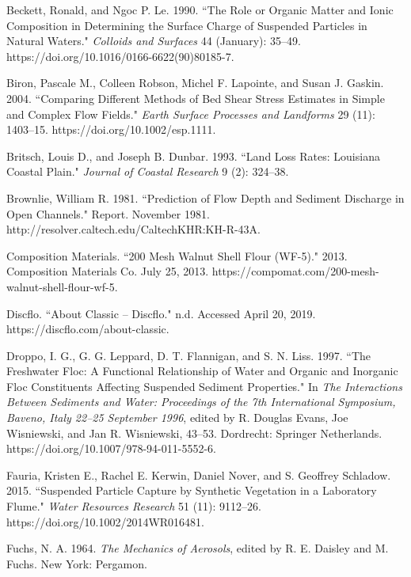 \documentclass[12pt]{article}
\begin{document}
\pagebreak

\begin{thebibliography}{20}
Beckett, Ronald, and Ngoc P. Le. 1990. ``The Role or Organic Matter and Ionic Composition in Determining the Surface Charge of Suspended Particles in Natural Waters." \textit{Colloids and Surfaces} 44 (January): 35–49. https://doi.org/10.1016/0166-6622(90)80185-7.

Biron, Pascale M., Colleen Robson, Michel F. Lapointe, and Susan J. Gaskin. 2004. ``Comparing Different Methods of Bed Shear Stress Estimates in Simple and Complex Flow Fields." \textit{Earth Surface Processes and Landforms} 29 (11): 1403–15. https://doi.org/10.1002/esp.1111.

Britsch, Louis D., and Joseph B. Dunbar. 1993. ``Land Loss Rates: Louisiana Coastal Plain." \textit{Journal of Coastal Research} 9 (2): 324–38.

Brownlie, William R. 1981. ``Prediction of Flow Depth and Sediment Discharge in Open Channels." Report. November 1981. http://resolver.caltech.edu/CaltechKHR:KH-R-43A.

Composition Materials. ``200 Mesh Walnut Shell Flour (WF-5)." 2013. Composition Materials Co. July 25, 2013. https://compomat.com/200-mesh-walnut-shell-flour-wf-5.

Discflo. ``About Classic – Discflo." n.d. Accessed April 20, 2019. https://discflo.com/about-classic.

Droppo, I. G., G. G. Leppard, D. T. Flannigan, and S. N. Liss. 1997. ``The Freshwater Floc: A Functional Relationship of Water and Organic and Inorganic Floc Constituents Affecting Suspended Sediment Properties." In \textit{The Interactions Between Sediments and Water: Proceedings of the 7th International Symposium, Baveno, Italy 22–25 September 1996}, edited by R. Douglas Evans, Joe Wisniewski, and Jan R. Wisniewski, 43–53. Dordrecht: Springer Netherlands. https://doi.org/10.1007/978-94-011-5552-6.

Fauria, Kristen E., Rachel E. Kerwin, Daniel Nover, and S. Geoffrey Schladow. 2015. ``Suspended Particle Capture by Synthetic Vegetation in a Laboratory Flume." \textit{Water Resources Research} 51 (11): 9112–26. https://doi.org/10.1002/2014WR016481.

Fuchs, N. A. 1964. \textit{The Mechanics of Aerosols}, edited by R. E. Daisley and M. Fuchs. New York: Pergamon.


\end{thebibliography}
\end{document}
